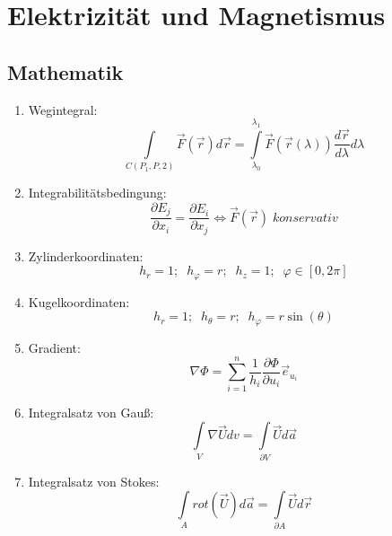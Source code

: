 \documentclass[a4paper,twocolumn,10pt]{article}
\begin{document}
\section{Elektrizität und Magnetismus}

\subsection{Mathematik}
\begin{enumerate}[label=$\bullet$]
\item Wegintegral:
\begin{equation*}
 \int\limits_{C(P_1,P,2)}\overrightarrow{F}(\overrightarrow{r})d\overrightarrow{r}=\int\limits_{\lambda_0}^{\lambda_1}\overrightarrow{F}(\overrightarrow{r}(\lambda))\frac{d\overrightarrow{r}}{d \lambda}d \lambda
\end{equation*}
\item Integrabilitätsbedingung:
\begin{equation*}
\frac{\partial E_j}{\partial x_i}=\frac{\partial E_i}{\partial x_j}\Leftrightarrow \overrightarrow{F}(\overrightarrow{r})\;konservativ
\end{equation*}
\item Zylinderkoordinaten:
\begin{equation*}
h_r=1;\;\;h_{\varphi}=r;\;\;h_z=1;\;\;\varphi\in [0,2\pi]
\end{equation*}
\item Kugelkoordinaten:
\begin{equation*}
h_r=1;\;\;h_{\theta}=r;\;\;h_{\varphi}=r\sin(\theta)
\end{equation*}
\item Gradient:
\begin{equation*}
\nabla\Phi =\sum\limits_{i=1}^{n}\frac{1}{h_i}\frac{\partial\Phi}{\partial u_i}\overrightarrow{e}_{u_i}
\end{equation*}
\item Integralsatz von Gauß:
\begin{equation*}
\int\limits_{V}\nabla\overrightarrow{U}dv=\int\limits_{\partial V}\overrightarrow{U}d\overrightarrow{a}
\end{equation*}
\item Integralsatz von Stokes:
\begin{equation*}
\int\limits_{A}rot(\overrightarrow{U})d\overrightarrow{a}=\int\limits_{\partial A}\overrightarrow{U}d\overrightarrow{r}
\end{equation*}
\end{enumerate}
\end{document}
